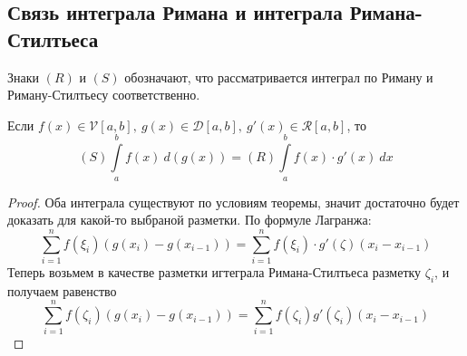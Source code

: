 \subsection{Связь интеграла Римана и интеграла Римана-Стилтьеса}
Знаки $(R)$ и $(S)$ обозначают, что рассматривается интеграл по Риману и Риману-Стилтьесу соответственно.
\begin{theorem}
    Если $f(x)\in \mathcal{V}[a,b],\ g(x)\in \mathcal{D}[a,b],\ g'(x)\in \mathcal{R}[a,b]$, то
    \[(S)\int\limits_{a}^{b}f(x)\ d(g(x))=(R)\int\limits_{a}^{b}f(x)\cdot g'(x)\ dx\]
\end{theorem} 
\begin{proof}
    Оба интеграла существуют по условиям теоремы, значит достаточно будет доказать для какой-то выбраной разметки. По формуле Лагранжа:
    \[\sum\limits_{i=1}^{n}f(\xi_i)(g(x_i)-g(x_{i-1}))=\sum\limits_{i=1}^{n}f(\xi_i)\cdot g'(\zeta)(x_i-x_{i-1})\]
    Теперь возьмем в качестве разметки игтеграла Римана-Стилтьеса разметку $\zeta_i$, и получаем равенство
    \[\sum\limits_{i=1}^{n}f(\zeta_i)(g(x_i)-g(x_{i-1}))=\sum\limits_{i=1}^{n}f(\zeta_i)g'(\zeta_i)(x_i-x_{i-1})\]
\end{proof} 
